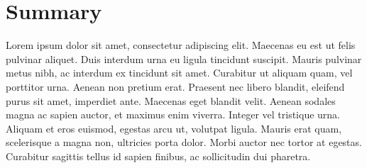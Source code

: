 %
%
%

\newpage
\chapter*{Summary}

Lorem ipsum dolor sit amet, consectetur adipiscing elit. Maecenas eu est ut felis pulvinar aliquet. Duis interdum urna eu ligula tincidunt suscipit. Mauris pulvinar metus nibh, ac interdum ex tincidunt sit amet. Curabitur ut aliquam quam, vel porttitor urna. Aenean non pretium erat. Praesent nec libero blandit, eleifend purus sit amet, imperdiet ante. Maecenas eget blandit velit. Aenean sodales magna ac sapien auctor, et maximus enim viverra. Integer vel tristique urna. Aliquam et eros euismod, egestas arcu ut, volutpat ligula. Mauris erat quam, scelerisque a magna non, ultricies porta dolor. Morbi auctor nec tortor at egestas. Curabitur sagittis tellus id sapien finibus, ac sollicitudin dui pharetra.
